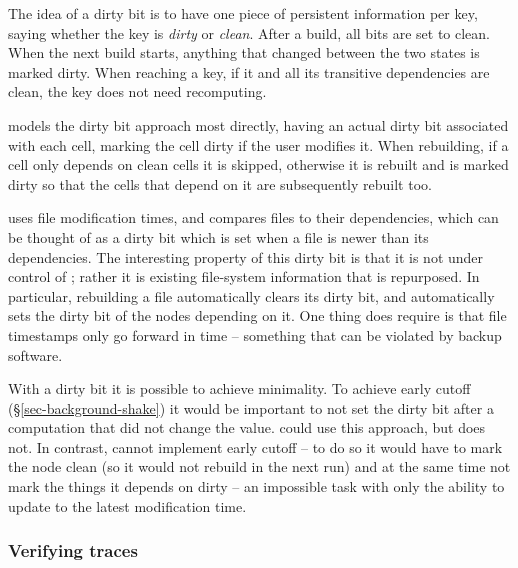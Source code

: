 The idea of a dirty bit is to have one piece of persistent
information per key, saying whether the key is
\emph{dirty} or \emph{clean}. After a build, all bits are set to clean. When the
next build starts, anything that changed between the two states is marked
dirty.
When reaching a key, if it and all its transitive dependencies are clean, the
key does not need recomputing.

\Excel models the dirty bit approach most directly, having an actual dirty bit
associated with each cell, marking the cell dirty if the user modifies it.
When rebuilding, if a cell only depends on clean cells it is skipped, otherwise
it is rebuilt and is marked dirty so that the cells that depend on it are
subsequently rebuilt too.


\Make uses file modification times, and compares files to their
dependencies, which can be thought of as a dirty bit which is set when
a file is newer than its dependencies. The interesting property of
this dirty bit is that it is not under control of \Make; rather it is
existing file-system information that is repurposed. In particular,
rebuilding a file automatically clears its dirty bit, and
automatically sets the dirty bit of the nodes depending on it. One
thing \Make does require is that file timestamps only go forward in
time -- something that can be violated by backup software.

With a dirty bit it is possible to achieve minimality. To achieve early cutoff
(\S\ref{sec-background-shake}) it would be important to not set the dirty bit
after a computation that did not change the value. \Excel could use this
approach, but does not. In contrast, \Make cannot implement early cutoff -- to
do so it would have to mark the node clean (so it would not rebuild in the next
run) and at the same time not mark the things it depends on dirty -- an
impossible task with only the ability to update to the latest modification time.


\subsubsection{Verifying traces}\label{sec-verifying-traces}

